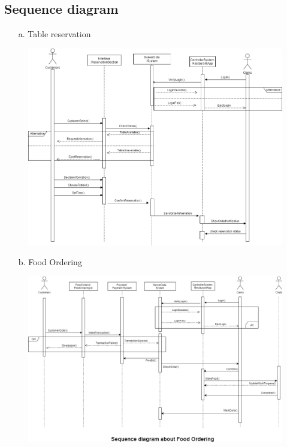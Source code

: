 \documentclass[11pt]{article}
\begin{document}
    \subsection{Sequence diagram}
        \begin{enumerate}
            \item[a.] Table reservation
        \end{enumerate}
            \begin{figure}[!h]
                \centering
                \includegraphics[width=16cm]{Sequence diagram/TableReservation.png}
            \end{figure}
        \cleardoublepage
        \begin{enumerate}
            \item[b.] Food Ordering
        \end{enumerate}
            \begin{figure}[!h]
                \centering
                \includegraphics[width=16cm]{Sequence diagram/FoodOrdering.png}
            \end{figure}
    \cleardoublepage
\end{document}
